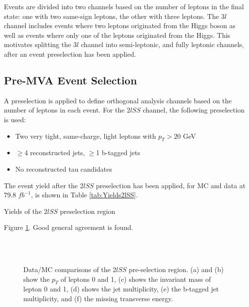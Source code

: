  Events are divided into two channels based on the number of leptons in the final state: one with two same-sign leptons, the other with three leptons. The $3l$ channel includes events where two leptons originated from the Higgs boson as well as events where only one of the leptons originated from the Higgs. This motivates splitting the $3l$ channel into semi-leptonic, and fully leptonic channels, after an event preselection has been applied.


\subsection{Pre-MVA Event Selection}
\label{subsec:preMVA}

A preselection is applied to define orthogonal analysis channels based on the number of leptons in each event. For the $2lSS$ channel, the following preselection is used:

\begin{itemize}
  \item Two very tight, same-charge, light leptons with $p_T > 20$ GeV
  \item $\geq$4 reconstructed jets, $\geq$1 b-tagged jets
  \item No reconstructed tau candidates
\end{itemize}

The event yield after the $2lSS$ preselection has been applied, for MC and data at 79.8 $fb^{-1}$, is shown in Table \ref{tab:Yields2lSS}. 

\begin{table}[H]

\label{tab:Yields2lSS}
\caption{Yields of the $2lSS$ preselection region}
\end{table}

Figure \ref{fig:presel2lSS}. Good general agreement is found.

\begin{figure}[H]
    \centering
    \\
    \\
    \caption{Data/MC comparisons of the $2lSS$ pre-selection region. (a) and (b) show the $p_T$ of leptons 0 and 1, (c) shows the invariant mass of lepton 0 and 1, (d) shows the jet multiplicity, (e) the b-tagged jet multiplicity, and (f) the missing transverse energy.}                           
    \label{fig:presel2lSS}
\end{figure}

